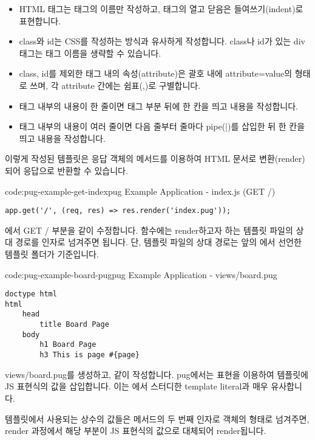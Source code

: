 \begin{itemize}
    \item HTML 태그는 태그의 이름만 작성하고, 태그의 열고 닫음은 들여쓰기(indent)로 표현합니다.
    \item class와 id는 CSS를 작성하는 방식과 유사하게 작성합니다. class나 id가 있는 div 태그는 태그 이름을 생략할 수 있습니다.
    \item class, id를 제외한 태그 내의 속성(attribute)은 괄호 내에 attribute=value의 형태로 쓰며, 각 attribute 간에는 쉼표(,)로 구별합니다.
    \item 태그 내부의 내용이 한 줄이면 태그 부분 뒤에 한 칸을 띄고 내용을 작성합니다.
    \item 태그 내부의 내용이 여러 줄이면 다음 줄부터 줄마다 pipe(|)를 삽입한 뒤 한 칸을 띄고 내용을 작성합니다.
\end{itemize}

이렇게 작성된 템플릿은 응답 객체의  메서드를 이용하여 HTML 문서로 변환(render)되어 응답으로 반환할 수 있습니다.

\begin{codeenv}{code:pug-example-get-index}{pug Example Application - index.js (GET /)}\begin{verbatim}
app.get('/', (req, res) => res.render('index.pug'));
\end{verbatim}
\end{codeenv}

에서 GET / 부분을 \와 같이 수정합니다.  함수에는 render하고자 하는 템플릿 파일의 상대 경로를 인자로 넘겨주면 됩니다. 단, 템플릿 파일의 상대 경로는 앞의 에서 선언한 템플릿 폴더가 기준입니다.

\begin{codeenv}{code:pug-example-board-pug}{pug Example Application - views/board.pug}\begin{verbatim}
doctype html
html
    head
        title Board Page
    body
        h1 Board Page
        h3 This is page #{page}
\end{verbatim}
\end{codeenv}

views/board.pug를 생성하고, \와 같이 작성합니다. pug에서는 \cd{\#\{\}} 표현을 이용하여 템플릿에 JS 표현식의 값을 삽입합니다. 이는 에서 스터디한 template literal과 매우 유사합니다.

템플릿에서 사용되는 상수의 값들은  메서드의 두 번째 인자로 객체의 형태로 넘겨주면, render 과정에서 해당 부분이 JS 표현식의 값으로 대체되어 render됩니다.

